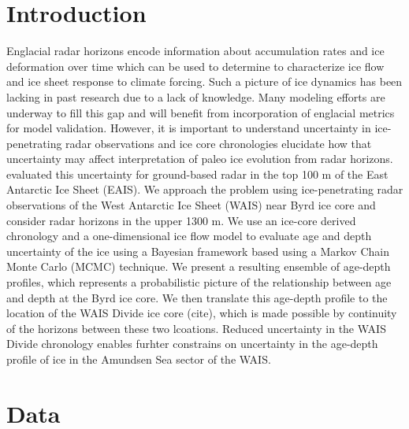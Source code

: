 \documentclass[12pt]{article}
\begin{document}
\section{Introduction}


Englacial radar horizons encode information about accumulation rates and ice deformation over time which can be used to determine to characterize ice flow and ice sheet response to climate forcing. Such a picture of ice dynamics has been lacking in past research due to a lack of knowledge. Many modeling efforts are underway to fill this gap and will benefit from incorporation of englacial metrics for model validation. However, it is important to understand uncertainty in ice-penetrating radar  observations and ice core chronologies elucidate how that uncertainty may affect interpretation of paleo ice evolution from radar horizons. \cite{eisen04} evaluated this uncertainty for ground-based radar in the top 100 m of the East Antarctic Ice Sheet (EAIS). We approach the problem using ice-penetrating radar observations of the West Antarctic Ice Sheet (WAIS) near Byrd ice core and consider radar horizons in the upper 1300 m.  We use an ice-core derived chronology and a one-dimensional ice flow model to evaluate age and depth uncertainty of the ice using a Bayesian framework based using a Markov Chain Monte Carlo (MCMC) technique. We present a resulting ensemble of age-depth profiles, which represents a probabilistic picture of the relationship between age and depth at the Byrd ice core. We then translate this age-depth profile to the location of the WAIS Divide ice core (cite), which is made possible by continuity of the horizons between these two lcoations. Reduced uncertainty in the WAIS Divide chronology enables furhter constrains on uncertainty in the age-depth profile of ice in the Amundsen Sea sector of the WAIS. 

\section{Data}
\end{document}
